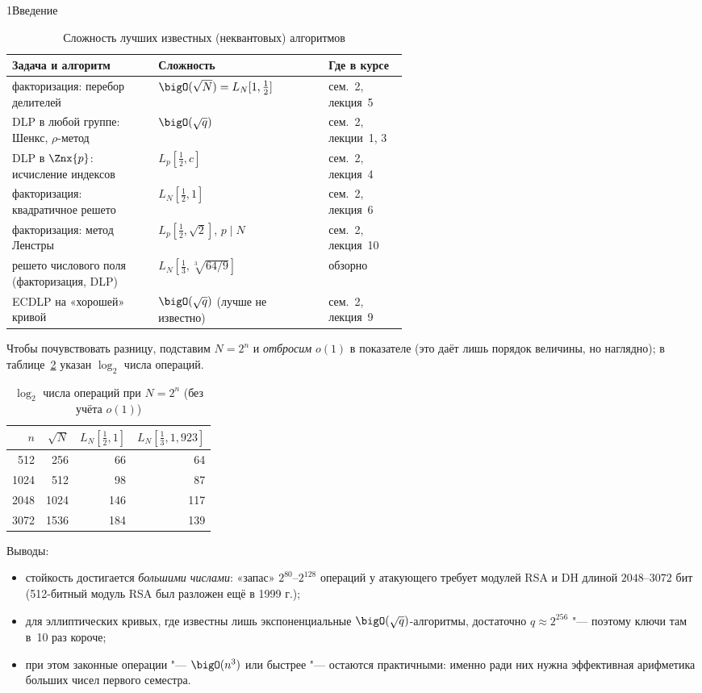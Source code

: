 \begin{lecture}{1}{Введение}
\begin{table}[!htb]
\centering\small
\caption{Сложность лучших известных (неквантовых) алгоритмов}\label{l1:tab-costs}
\begin{tabular}{p{0.37\linewidth}lp{0.2\linewidth}}
\hline
Задача и алгоритм & Сложность & Где в курсе \\
\hline
факторизация: перебор делителей & $\bigO(\sqrt N) = L_N[1, \tfrac12]$ & сем.~2, лекция~5 \\
DLP в любой группе: Шенкс, $\rho$-метод & $\bigO(\sqrt q)$ & сем.~2, лекции~1, 3 \\
DLP в $\Znx{p}$: исчисление индексов & $L_p[\tfrac12, c]$ & сем.~2, лекция~4 \\
факторизация: квадратичное решето & $L_N[\tfrac12, 1]$ & сем.~2, лекция~6 \\
факторизация: метод Ленстры & $L_p[\tfrac12, \sqrt2]$, $p \mid N$ & сем.~2, лекция~10 \\
решето числового поля (факторизация, DLP) & $L_N[\tfrac13, \sqrt[3]{64/9}]$ & обзорно \\
ECDLP на «хорошей» кривой & $\bigO(\sqrt q)$ (лучше не известно) & сем.~2, лекция~9 \\
\hline
\end{tabular}
\end{table}

Чтобы почувствовать разницу, подставим $N = 2^n$ и \emph{отбросим} $o(1)$ в показателе (это
даёт лишь порядок величины, но наглядно); в таблице~\ref{l1:tab-bits} указан $\log_2$ числа
операций.

\begin{table}[!htb]
\centering\small
\caption{$\log_2$ числа операций при $N = 2^n$ (без учёта $o(1)$)}\label{l1:tab-bits}
\begin{tabular}{rrrr}
\hline
$n$ & $\sqrt N$ & $L_N[\tfrac12, 1]$ & $L_N[\tfrac13, 1{,}923]$ \\
\hline
512 & 256 & 66 & 64 \\
1024 & 512 & 98 & 87 \\
2048 & 1024 & 146 & 117 \\
3072 & 1536 & 184 & 139 \\
\hline
\end{tabular}
\end{table}

Выводы:
\begin{itemize}
  \item стойкость достигается \emph{большими числами}: «запас» $2^{80}$--$2^{128}$ операций
    у атакующего требует модулей RSA и DH длиной $2048$--$3072$ бит (512-битный модуль RSA был
    разложен ещё в 1999 г.);
  \item для эллиптических кривых, где известны лишь экспоненциальные $\bigO(\sqrt q)$-алгоритмы,
    достаточно $q \approx 2^{256}$ "--- поэтому ключи там в~10 раз короче;
  \item при этом законные операции "--- $\bigO(n^3)$ или быстрее "--- остаются практичными:
    именно ради них нужна эффективная арифметика больших чисел первого семестра.
\end{itemize}


\end{lecture}
